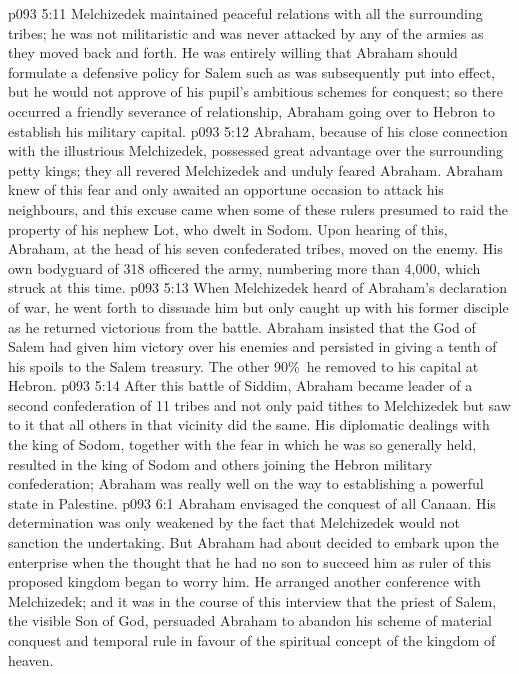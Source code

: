 \vs p093 5:11 Melchizedek maintained peaceful relations with all the surrounding tribes; he was not militaristic and was never attacked by any of the armies as they moved back and forth. He was entirely willing that Abraham should formulate a defensive policy for Salem such as was subsequently put into effect, but he would not approve of his pupil’s ambitious schemes for conquest; so there occurred a friendly severance of relationship, Abraham going over to Hebron to establish his military capital.
\vs p093 5:12 Abraham, because of his close connection with the illustrious Melchizedek, possessed great advantage over the surrounding petty kings; they all revered Melchizedek and unduly feared Abraham. Abraham knew of this fear and only awaited an opportune occasion to attack his neighbours, and this excuse came when some of these rulers presumed to raid the property of his nephew Lot, who dwelt in Sodom. Upon hearing of this, Abraham, at the head of his seven confederated tribes, moved on the enemy. His own bodyguard of 318 officered the army, numbering more than 4,000, which struck at this time.
\vs p093 5:13 When Melchizedek heard of Abraham’s declaration of war, he went forth to dissuade him but only caught up with his former disciple as he returned victorious from the battle. Abraham insisted that the God of Salem had given him victory over his enemies and persisted in giving a tenth of his spoils to the Salem treasury. The other 90\%\ he removed to his capital at Hebron.
\vs p093 5:14 After this battle of Siddim, Abraham became leader of a second confederation of 11 tribes and not only paid tithes to Melchizedek but saw to it that all others in that vicinity did the same. His diplomatic dealings with the king of Sodom, together with the fear in which he was so generally held, resulted in the king of Sodom and others joining the Hebron military confederation; Abraham was really well on the way to establishing a powerful state in Palestine.
\vs p093 6:1 Abraham envisaged the conquest of all Canaan. His determination was only weakened by the fact that Melchizedek would not sanction the undertaking. But Abraham had about decided to embark upon the enterprise when the thought that he had no son to succeed him as ruler of this proposed kingdom began to worry him. He arranged another conference with Melchizedek; and it was in the course of this interview that the priest of Salem, the visible Son of God, persuaded Abraham to abandon his scheme of material conquest and temporal rule in favour of the spiritual concept of the kingdom of heaven.
